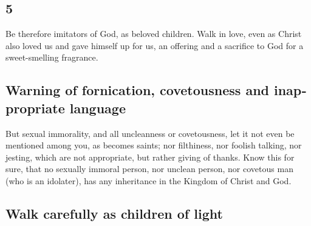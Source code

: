 \begin{paracol}{2}
\switchcolumn
\begin{otherlanguage}{english}

\hypertarget{section-9}{%
\section{5}\label{section-9}}

 Be therefore imitators of God, as beloved children.
 Walk in love, even as Christ also loved us and gave
himself up for us, an offering and a sacrifice to God for a
sweet-smelling fragrance.

\hypertarget{warning-of-fornication-covetousness-and-inappropriate-language}{%
\subsection{Warning of fornication, covetousness and inappropriate
language}\label{warning-of-fornication-covetousness-and-inappropriate-language}}

 But sexual immorality, and all uncleanness or
covetousness, let it not even be mentioned among you, as becomes saints;
 nor filthiness, nor foolish talking, nor jesting, which
are not appropriate, but rather giving of thanks.  Know
this for sure, that no sexually immoral person, nor unclean person, nor
covetous man (who is an idolater), has any inheritance in the Kingdom of
Christ and God.

\hypertarget{walk-carefully-as-children-of-light}{%
\subsection{Walk carefully as children of
light}\label{walk-carefully-as-children-of-light}}


\end{otherlanguage}
\end{paracol}
